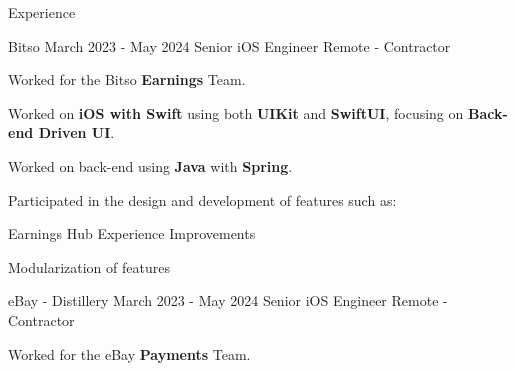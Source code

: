 \documentclass{curriculum}
\begin{document}

\begin{cvsection}{Experience}


    \makesectionitemheader
        {Bitso}                     {March 2023 - May 2024}
        {Senior iOS Engineer}       {Remote - Contractor}

        \begin{sectionitemlist}

        \item{
            Worked for the Bitso \textbf{Earnings} Team.
        }
        \item{
            Worked on \textbf{iOS with Swift} using both \textbf{UIKit} and \textbf{SwiftUI}, focusing on \textbf{Back-end Driven UI}.
        }
        \item{
            Worked on back-end using \textbf{Java} with \textbf{Spring}.
        }
        \item{
            Participated in the design and development of features such as:
            \begin{colsectionitemlist}{2}
            \item{Earnings Hub Experience Improvements}
            \item{Modularization of features}
            \end{colsectionitemlist}
        }

        \end{sectionitemlist}


    \makesectionitemheader
        {eBay - Distillery}         {March 2023 - May 2024}
        {Senior iOS Engineer}       {Remote - Contractor}

        \begin{sectionitemlist}

        \item{
            Worked for the eBay \textbf{Payments} Team.
        }


\end{sectionitemlist}
\end{cvsection}
\end{document}
